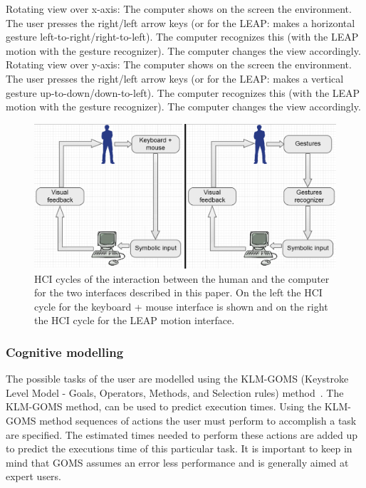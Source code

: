 \newline\newline
Rotating view over x-axis: 
\newline The computer shows on the screen the environment. The user presses the right/left arrow keys (or for the LEAP: makes a horizontal gesture left-to-right/right-to-left). The computer recognizes this (with the LEAP motion with the gesture recognizer). The computer changes the view accordingly.
\newline\newline
Rotating view over y-axis: 
\newline The computer shows on the screen the environment. The user presses the right/left arrow keys (or for the LEAP: makes a vertical gesture up-to-down/down-to-left). The computer recognizes this (with the LEAP motion with the gesture recognizer). The computer changes the view accordingly.

\begin{figure}
\includegraphics[width=\textwidth]{imgs/HCIcycles.png}
\caption{HCI cycles of the interaction between the human and the computer for the two interfaces described in this paper. On the left the HCI cycle for the keyboard + mouse interface is shown and on the right the HCI cycle for the LEAP motion interface.}
\label{fig:HCIcyles}
\end{figure}

\subsubsection{Cognitive modelling}
The possible tasks of the user are modelled using the KLM-GOMS (Keystroke Level Model - Goals, Operators, Methods, and Selection rules) method~\cite{john1996goms}. The KLM-GOMS method, can be used to predict execution times. Using the KLM-GOMS method sequences of actions the user must perform to accomplish a task are specified. The estimated times needed to perform these actions are added up to predict the executions time of this particular task. It is important to keep in mind that GOMS assumes an error less performance and is generally aimed at expert users.

